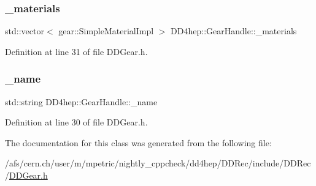 \subsubsection{\texorpdfstring{\+\_\+materials}{\_materials}}
{\footnotesize\ttfamily std\+::vector$<$ gear\+::\+Simple\+Material\+Impl $>$ D\+D4hep\+::\+Gear\+Handle\+::\+\_\+materials\hspace{0.3cm}{\ttfamily [protected]}}



Definition at line 31 of file D\+D\+Gear.\+h.

\hypertarget{class_d_d4hep_1_1_gear_handle_a73f13b4c51b157ad9ff56335a5063d3b}{}\label{class_d_d4hep_1_1_gear_handle_a73f13b4c51b157ad9ff56335a5063d3b} 
\subsubsection{\texorpdfstring{\+\_\+name}{\_name}}
{\footnotesize\ttfamily std\+::string D\+D4hep\+::\+Gear\+Handle\+::\+\_\+name\hspace{0.3cm}{\ttfamily [protected]}}



Definition at line 30 of file D\+D\+Gear.\+h.



The documentation for this class was generated from the following file\+:\begin{DoxyCompactItemize}
\item 
/afs/cern.\+ch/user/m/mpetric/nightly\+\_\+cppcheck/dd4hep/\+D\+D\+Rec/include/\+D\+D\+Rec/\hyperlink{_d_d_gear_8h}{D\+D\+Gear.\+h}\end{DoxyCompactItemize}
